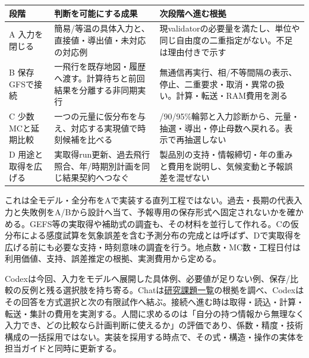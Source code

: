\documentclass[11pt,a4paper]{article}
\newcounter{none}
\begin{document}
{\def\LTcaptype{none} %
\begin{longtable}[]{@{}
  >{\raggedright\arraybackslash}p{}
  >{\raggedright\arraybackslash}p{}
  >{\raggedright\arraybackslash}p{}@{}}
\toprule\noalign{}
\begin{minipage}[b]{\linewidth}\raggedright
段階
\end{minipage} & \begin{minipage}[b]{\linewidth}\raggedright
判断を可能にする成果
\end{minipage} & \begin{minipage}[b]{\linewidth}\raggedright
次段階へ進む根拠
\end{minipage} \\
\midrule\noalign{}
\endhead
\bottomrule\noalign{}
\endlastfoot
A 入力を閉じる & 簡易/等温の具体入力と、直接値・導出値・未対応の対応例 &
現validatorの必要量を満たし、単位や同じ自由度の二重指定がない。不足は理由付きで示す \\
B 保存GFSで接続 &
一飛行を既存地図・履歴へ渡す。計算待ちと前回結果を分離する非同期実行 &
無通信再実行、相/不等間隔の表示、停止、二重要求・取消・異常の扱い。計算・転送・RAM費用を測る \\
C 少数MCと延期比較 &
一つの元量に仮分布を与え、対応する実現値で時刻候補を比べる &
50/90/95\%輪郭と入力診断から、元量・抽選・導出・停止母数へ戻れる。表示で再抽選しない \\
D 用途と取得を広げる &
実取得run更新、過去飛行照合、年/時期別計画を同じ結果契約へつなぐ &
製品別の支持・情報締切・年の重みと費用を説明し、気候変動と予報誤差を混ぜない \\
\end{longtable}
}

これは全モデル・全分布をAで実装する直列工程ではない。過去・長期の代表入力と失敗例をA/Bから設計へ当て、予報専用の保存形式へ固定されないかを確かめる。GEFS等の実取得や補助式の調査も、その材料を並行して作れる。Cの仮分布による感度試算を気象誤差を含む予測分布の完成とは呼ばず、Dで実取得を広げる前にも必要な支持・時刻意味の調査を行う。地点数・MC数・工程日付は利用価値、支持、誤差推定の根拠、実測費用から定める。

Codexは今回、入力をモデルへ展開した具体例、必要値が足りない例、保存/比較の反例と残る選択肢を持ち寄る。Chatは\href{research/TASKS.md}{研究課題一覧}の根拠を調べ、Codexはその回答を方式選択と次の有限試作へ結ぶ。接続へ進む時は取得・読込・計算・転送・集計の費用を実測する。人間に求めるのは「自分の持つ情報から無理なく入力でき、どの比較なら計画判断に使えるか」の評価であり、係数・精度・技術構成の一括採用ではない。実装を採用する時点で、その式・構造・操作の実体を担当ガイドと同時に更新する。
\end{document}
